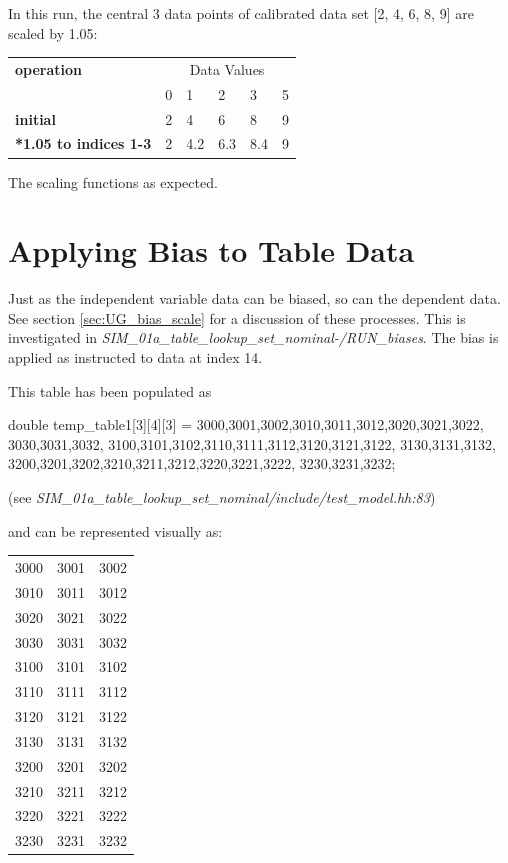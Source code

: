 \documentclass[11pt,fleqn]{report}
\begin{document}
In this run, the central 3 data points of calibrated data set [2, 4, 6, 8,
9] are scaled by 1.05:
\begin{table}[!ht]
\begin{center}
\begin{tabular}{||l||l|l|l|l|l||}
\hline \hline
\textbf{operation}&
\multicolumn{5}{c||}{Data Values} \\
&0&1&2&3&5\\
\hline \hline
\textbf{initial}              &2&4&6&8&9 \\
\textbf{*1.05 to indices 1-3} &2&4.2&6.3&8.4&9 \\
\hline \hline
\end{tabular}
\end{center}
\end{table}

The scaling functions as expected.



\section {Applying Bias to Table Data} \label{sec:VV_bias_dependent}
Just as the independent variable data can be biased, so can the dependent
data.
See section \ref{sec:UG_bias_scale} for a discussion of these processes.
This is investigated in
\textit{SIM\_01a\_table\_lookup\_set\_nominal-/RUN\_biases}.  The bias is
applied as instructed to data at index 14.

This table has been populated as
\begin{code}
double temp_table1[3][4][3] =
        {{{3000,3001,3002},{3010,3011,3012},{3020,3021,3022},
          {3030,3031,3032}},
          {{3100,3101,3102},{3110,3111,3112},{3120,3121,3122},
          {3130,3131,3132}},
          {{3200,3201,3202},{3210,3211,3212},{3220,3221,3222},
          {3230,3231,3232}}};
\end{code}
(see \textit{SIM\_01a\_table\_lookup\_set\_nominal/include/test\_model.hh:83})

and can be represented visually as:
\begin{table}[H]
\begin{center}
\begin{tabular}{|l|l|l|}
\hline
3000 & 3001 & 3002\\3010 & 3011 & 3012\\3020 & 3021 & 3022\\3030 & 3031 & 3032\\
\hline
3100 & 3101 & 3102\\3110 & 3111 & 3112\\3120 & 3121 & 3122\\3130 & 3131 & 3132\\
\hline
3200 & 3201 & 3202\\3210 & 3211 & 3212\\3220 & 3221 & 3222\\3230 & 3231 & 3232\\
\hline
\end{tabular}
\end{center}
\end{table}
\end{document}
